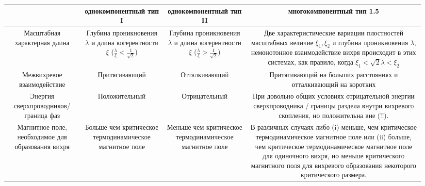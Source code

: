 \begin{table}[ht]
    \centering
    \begin{tabular}{|C{.18}|C{.22}|C{.22}|C{.35}|}
        \hline
        & однокомпонентный тип I & однокомпонентный тип II & 
        многокомпонентный тип 1.5 \\ \hline

        Масштабная характерная длина & Глубина проникновения \( \lambda \) и 
            длина когерентности \( \xi \) 
            (\( \frac{\lambda}{\xi} < \frac{1}{\sqrt{2}} \)) &
        Глубина проникновения \( \lambda \) и 
            длина когерентности \( \xi \) 
            (\( \frac{\lambda}{\xi} > \frac{1}{\sqrt{2}} \)) &
        Две характеристические вариации плостностей масштабных величие 
            \( \xi_1, \xi_2 \) и глубина проникновения \( \lambda \), 
            немонотонное взаимодействие вихря происходит в этих системах, как 
            правило, когда \( \xi_1 < \sqrt{2}\lambda < \xi_2 \) \\ \hline

        Межвихревое взаимодействие & Притягивающий & Отталкивающий & 
            Притягивающий на больших расстояниях и отталкивающий на коротких 
        \\ \hline

        Энергия сверхпроводников/граница фаз & Положительный & Отрицательный &
            При довольно общих условиях отрицательной энергии сверхпроводника / 
            границы раздела внутри вихревого скопления, но положительна вне (!!).

        \\ \hline

        Магнитное поле, необходимое для образования вихря & Больше чем 
            критическое термодинамическое магнитное поле & Меньше чем 
            критическое термодинамическое магнитное поле &
        В различных случаях либо (i) меньше, чем критическое термодинамическое 
            магнитное поле или (ii) больше, чем критическое термодинамическое
            магнитное поле для одиночного вихря, но меньше критического 
            магнитного поля для вихревого образования некоторого критического 
            размера.

        \\ \hline


\end{tabular}
\end{table}
